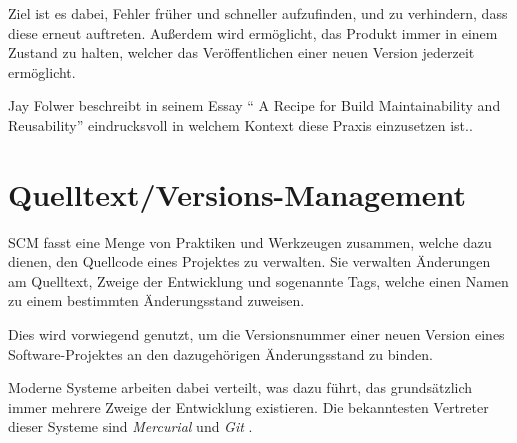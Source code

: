Ziel ist es dabei, Fehler früher und schneller aufzufinden,
und zu verhindern, dass diese erneut auftreten.
Außerdem wird ermöglicht, das Produkt immer in einem Zustand zu halten,
welcher das Veröffentlichen einer neuen Version jederzeit ermöglicht.

Jay Folwer beschreibt in seinem Essay ``
A Recipe for Build Maintainability and Reusability'' \cite{folwer:receipe} eindrucksvoll in welchem Kontext diese Praxis einzusetzen ist..


\section{Quelltext/Versions-Management}
\label{sec:base:scm}


\ac{SCM} fasst eine Menge
von Praktiken und Werkzeugen zusammen,
welche dazu dienen, den Quellcode eines Projektes zu verwalten.
Sie verwalten Änderungen am Quelltext, Zweige der Entwicklung und sogenannte Tags,
welche einen Namen zu einem bestimmten Änderungsstand zuweisen.

Dies wird vorwiegend genutzt, um die Versionsnummer einer neuen Version eines Software-Projektes an den dazugehörigen Änderungsstand zu binden.

Moderne Systeme arbeiten dabei verteilt,
was dazu führt, das grundsätzlich immer mehrere Zweige der Entwicklung existieren.
Die bekanntesten Vertreter dieser Systeme sind \emph{Mercurial} \cite{mercurial:website}
und \emph{Git} \cite{git:website}.

